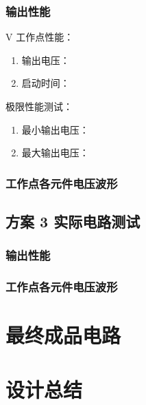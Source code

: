 \documentclass[UTF8]{article}
\theoremstyle{MyLineTheoremStyle} %
\theoremstyle{MyBlockTheoremStyle} %
\theoremstyle{MySubsubsectionStyle} %
\begin{document}
\subsubsection{输出性能}
 V 工作点性能：
\begin{enumerate}
\item 输出电压：
\item 启动时间：
\end{enumerate}

\noindent 极限性能测试：
\begin{enumerate}
\item 最小输出电压：
\item 最大输出电压：
\end{enumerate}
\subsubsection{工作点各元件电压波形}

\subsection{方案 3 实际电路测试}

\subsubsection{输出性能}
\subsubsection{工作点各元件电压波形}

\section{最终成品电路}

\section{设计总结}





\end{document}
